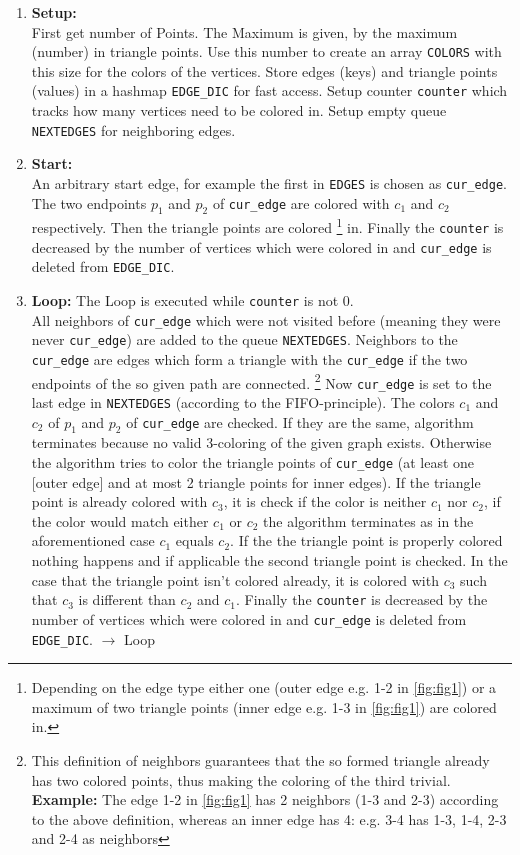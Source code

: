 \documentclass[english]{scrartcl}
\newcommand{\code}{\texttt}
\begin{document}
\begin{enumerate}
    \item \textbf{Setup:}\\ First get number of Points. The Maximum is given, by the maximum (number) in triangle points. Use this number to create an array \code{COLORS} with this size for the colors of the vertices. Store edges (keys) and triangle points (values) in a hashmap \code{EDGE\_DIC} for fast access. Setup counter \code{counter} which tracks how many vertices need to be colored in. Setup empty queue \code{NEXTEDGES} for neighboring edges.
    \item \textbf{Start:}\\ An arbitrary start edge, for example the first in \code{EDGES} is chosen as \code{cur\_edge}. The two endpoints $p_1$ and $p_2$ of \code{cur\_edge} are colored with $c_1$ and $c_2$ respectively. Then the triangle points are colored \footnote{Depending on the edge type either one (outer edge e.g. 1-2 in \autoref{fig:fig1}) or a maximum of two triangle points (inner edge e.g. 1-3 in \autoref{fig:fig1}) are colored in.} in. Finally the \code{counter} is decreased by the number of vertices which were colored in and \code{cur\_edge} is deleted from \code{EDGE\_DIC}.  
    \item \textbf{Loop:} The Loop is executed while \code{counter} is not 0. \\ All neighbors of \code{cur\_edge} which were not visited before (meaning they were never \code{cur\_edge}) are added to the queue \code{NEXTEDGES}. Neighbors to the \code{cur\_edge} are edges which form a triangle with the \code{cur\_edge} if the two endpoints of the so given path are connected. 
    \footnote{This definition of neighbors guarantees that the so formed triangle already has two colored points, thus making the coloring of the third trivial. \\ \textbf{Example:} The edge 1-2 in \autoref{fig:fig1} has 2 neighbors (1-3 and 2-3) according to the above definition, whereas an inner edge has 4: e.g. 3-4 has 1-3, 1-4, 2-3 and 2-4 as neighbors} 
    Now \code{cur\_edge} is set to the last edge in \code{NEXTEDGES} (according to the FIFO-principle). %
    The colors $c_1$ and $c_2$ of $p_1$ and $p_2$ of \code{cur\_edge} are checked. If they are the same, algorithm terminates because no valid 3-coloring of the given graph exists. Otherwise the algorithm tries to color the triangle points of \code{cur\_edge} (at least one [outer edge] and at most 2 triangle points for inner edges). If the triangle point is already colored with $c_3$, it is check if the color is neither $c_1$ nor $c_2$, if the color would match either $c_1$ or $c_2$ the algorithm terminates as in the aforementioned case $c_1$ equals $c_2$. If the the triangle point is properly colored nothing happens and if applicable the second triangle point is checked. In the case that the triangle point isn't colored already, it is colored with $c_3$ such that $c_3$ is different than $c_2$ and $c_1$. Finally the \code{counter} is decreased by the number of vertices which were colored in and \code{cur\_edge} is deleted from \code{EDGE\_DIC}. $\rightarrow$ Loop

\end{enumerate}
\end{document}
